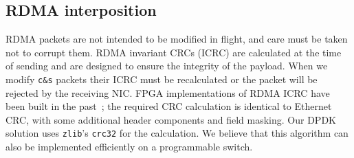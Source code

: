 




\subsection{RDMA interposition}

RDMA packets are not intended to be modified in
flight, and care must be taken not to corrupt them. RDMA invariant CRCs (ICRC)
are calculated at the time of sending and are designed to ensure the integrity
of the payload. When we modify \texttt{c\&s} packets their ICRC must be
recalculated or the packet will be rejected by the receiving NIC. FPGA
implementations of RDMA ICRC have been built in the past~\cite{Mansour_2019};
the required CRC calculation is identical to Ethernet CRC, with some additional
header components and field masking.  Our DPDK solution uses \texttt{zlib}'s
\texttt{crc32} for the calculation.  We believe that this algorithm can also be
implemented efficiently on a programmable switch.

